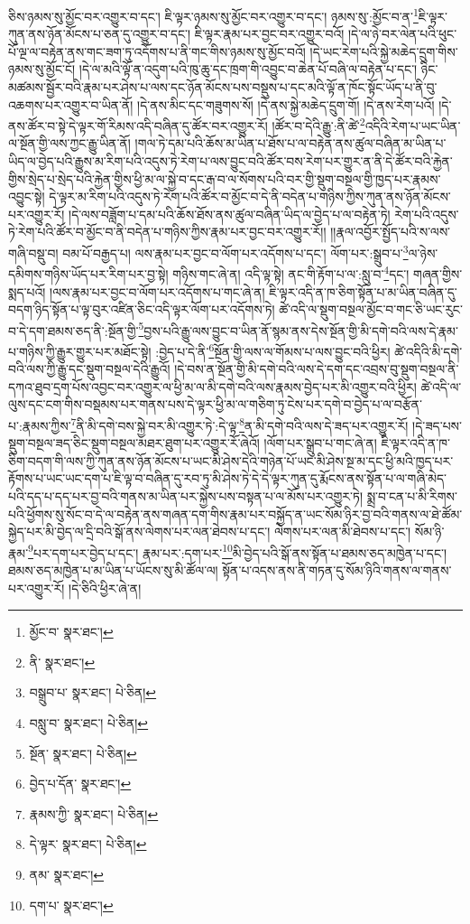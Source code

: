 ཅིས་ཉམས་སུ་མྱོང་བར་འགྱུར་བ་དང་། ཇི་ལྟར་ཉམས་སུ་མྱོང་བར་འགྱུར་བ་དང་། ཉམས་སུ་:མྱོང་བ་ན་\footnote{མྱོང་བ་  སྣར་ཐང་། }ཇི་ལྟར་ཀུན་ནས་ཉོན་མོངས་པ་ཅན་དུ་འགྱུར་བ་དང་། ཇི་ལྟར་རྣམ་པར་བྱང་བར་འགྱུར་བའོ། །དེ་ལ་ཉེ་བར་ལེན་པའི་ཕུང་པོ་ལྔ་ལ་བརྟེན་ནས་གང་ཟག་ཏུ་འདོགས་པ་ནི་གང་གིས་ཉམས་སུ་མྱོང་བའོ། །དེ་ཡང་རེག་པའི་སྐྱེ་མཆེད་དྲུག་གིས་ཉམས་སུ་མྱོང་ངོ། །དེ་ལ་མའི་ལྟོ་ན་འདུག་པའི་ཁུ་ཆུ་དང་ཁྲག་གི་འབྱུང་བ་ཆེན་པོ་བཞི་ལ་བརྟེན་པ་དང་། ཉིང་མཚམས་སྦྱོར་བའི་རྣམ་པར་ཤེས་པ་ལས་དང་ཉོན་མོངས་པས་བསྡུས་པ་དང་མའི་ལྟོ་ན་ཁོང་སྟོང་ཡོད་པ་ནི་བུ་འཆགས་པར་འགྱུར་བ་ཡིན་ནོ། །དེ་ནས་མིང་དང་གཟུགས་སོ། །དེ་ནས་སྐྱེ་མཆེད་དྲུག་གོ། །དེ་ནས་རེག་པའོ། །དེ་ནས་ཚོར་བ་སྟེ་དེ་ལྟར་གོ་རིམས་འདི་བཞིན་དུ་ཚོར་བར་འགྱུར་རོ། །ཚོར་བ་དེའི་རྒྱུ་:ནི་ཚེ་\footnote{ནི་  སྣར་ཐང་། }འདིའི་རེག་པ་ཡང་ཡིན་ལ་སྔོན་གྱི་ལས་ཀྱང་རྒྱུ་ཡིན་ནོ། །གལ་ཏེ་དམ་པའི་ཆོས་མ་ཡིན་པ་ཐོས་པ་ལ་བརྟེན་ནས་ཚུལ་བཞིན་མ་ཡིན་པ་ཡིད་ལ་བྱེད་པའི་རྒྱུས་མ་རིག་པའི་འདུས་ཏེ་རེག་པ་ལས་བྱུང་བའི་ཚོར་བས་རེག་པར་གྱུར་ན་ནི་དེ་ཚོར་བའི་རྐྱེན་གྱིས་སྲེད་པ་སྲེད་པའི་རྐྱེན་གྱིས་ཕྱི་མ་ལ་སྐྱེ་བ་དང་རྒ་བ་ལ་སོགས་པའི་བར་གྱི་སྡུག་བསྔལ་གྱི་ཁྱད་པར་རྣམས་འབྱུང་སྟེ། དེ་ལྟར་མ་རིག་པའི་འདུས་ཏེ་རེག་པའི་ཚོར་བ་མྱོང་བ་དེ་ནི་བདེན་པ་གཉིས་ཀྱིས་ཀུན་ནས་ཉོན་མོངས་པར་འགྱུར་རོ། །དེ་ལས་བཟློག་པ་དམ་པའི་ཆོས་ཐོས་ནས་ཚུལ་བཞིན་ཡིད་ལ་བྱེད་པ་ལ་བརྟེན་ཏེ། རེག་པའི་འདུས་ཏེ་རེག་པའི་ཚོར་བ་མྱོང་བ་ནི་བདེན་པ་གཉིས་ཀྱིས་རྣམ་པར་བྱང་བར་འགྱུར་རོ།། །།རྣལ་འབྱོར་སྤྱོད་པའི་ས་ལས་གཞི་བསྡུ་བ། བམ་པོ་བརྒྱད་པ། ལས་རྣམ་པར་བྱང་བ་ལོག་པར་འདོགས་པ་དང་། ལོག་པར་:སྒྲུབ་པ་\footnote{བསྒྲུབ་པ་  སྣར་ཐང་།  པེ་ཅིན། }ལ་ཉེས་དམིགས་གཉིས་ཡོད་པར་རིག་པར་བྱ་སྟེ། གཉིས་གང་ཞེ་ན། འདི་ལྟ་སྟེ། ནང་གི་རྟོག་པ་ལ་:སླུ་བ་\footnote{བསླུ་བ་  སྣར་ཐང་།  པེ་ཅིན། }དང་། གཞན་གྱིས་སྨད་པའོ། །ལས་རྣམ་པར་བྱང་བ་ལོག་པར་འདོགས་པ་གང་ཞེ་ན། ཇི་ལྟར་འདི་ན་ཁ་ཅིག་སྟོན་པ་མ་ཡིན་བཞིན་དུ་བདག་ཉིད་སྟོན་པ་ལྟ་བུར་འཛིན་ཅིང་འདི་ལྟར་ལོག་པར་འདོགས་ཏེ། ཚེ་འདི་ལ་སྡུག་བསྔལ་མྱོང་བ་གང་ཅི་ཡང་རུང་བ་དེ་དག་ཐམས་ཅད་ནི་:སྔོན་གྱི་\footnote{སྔོན་  སྣར་ཐང་།  པེ་ཅིན། }བྱས་པའི་རྒྱུ་ལས་བྱུང་བ་ཡིན་ནོ་སྙམ་ནས་དེས་སྔོན་གྱི་མི་དགེ་བའི་ལས་དེ་རྣམ་པ་གཉིས་ཀྱི་རྒྱུར་གྱུར་པར་མཐོང་སྟེ། :བྱེད་པ་དེ་ནི་\footnote{བྱེད་པ་དོན་  སྣར་ཐང་། }སྔོན་གྱི་ལས་ལ་གོམས་པ་ལས་བྱུང་བའི་ཕྱིར། ཚེ་འདིའི་མི་དགེ་བའི་ལས་ཀྱི་རྒྱུ་དང་སྡུག་བསྔལ་དེའི་རྒྱུའོ། །དེ་བས་ན་སྔོན་གྱི་མི་དགེ་བའི་ལས་དེ་དག་དང་འབྲས་བུ་སྡུག་བསྔལ་ནི་དཀའ་ཐུབ་དྲག་པོས་འབྱང་བར་འགྱུར་ལ་ཕྱི་མ་ལ་མི་དགེ་བའི་ལས་རྣམས་བྱེད་པར་མི་འགྱུར་བའི་ཕྱིར། ཚེ་འདི་ལ་ལུས་དང་ངག་གིས་བསྡམས་པར་གནས་པས་དེ་ལྟར་ཕྱི་མ་ལ་གཅིག་ཏུ་ངེས་པར་དགེ་བ་བྱེད་པ་ལ་བརྩོན་པ་:རྣམས་ཀྱིས་\footnote{རྣམས་ཀྱི་  སྣར་ཐང་།  པེ་ཅིན། }ནི་མི་དགེ་བས་སྐྱེ་བར་མི་འགྱུར་ཏེ་:དེ་ལྟ་\footnote{དེ་ལྟར་  སྣར་ཐང་།  པེ་ཅིན། }ན་མི་དགེ་བའི་ལས་དེ་ཟད་པར་འགྱུར་རོ། །དེ་ཟད་པས་སྡུག་བསྔལ་ཟད་ཅིང་སྡུག་བསྔལ་མཐར་ཐུག་པར་འགྱུར་རོ་ཞེའོ། །ལོག་པར་སྒྲུབ་པ་གང་ཞེ་ན། ཇི་ལྟར་འདི་ན་ཁ་ཅིག་བདག་གི་ལས་ཀྱི་ཀུན་ནས་ཉོན་མོངས་པ་ཡང་མི་ཤེས་དེའི་གཉེན་པོ་ཡང་མི་ཤེས་སྔ་མ་དང་ཕྱི་མའི་ཁྱད་པར་རྟོགས་པ་ཡང་ཡང་དག་པ་ཇི་ལྟ་བ་བཞིན་དུ་རབ་ཏུ་མི་ཤེས་ཏེ་དེ་དེ་ལྟར་ཀུན་དུ་རྨོངས་ནས་སྟོན་པ་ལ་གཞི་མེད་པའི་དད་པ་དད་པར་བྱ་བའི་གནས་མ་ཡིན་པར་སྐྱེས་པས་བསྟན་པ་ལ་མོས་པར་འགྱུར་ཏེ། སྨྲ་བ་ངན་པ་མི་རིགས་པའི་ཕྱོགས་སུ་སོང་བ་དེ་ལ་བརྟེན་ནས་གཞན་དག་གིས་རྣམ་པར་བསྐྱོད་ན་ཡང་སོམ་ཉིར་བྱ་བའི་གནས་ལ་ཐེ་ཚོམ་སྐྱེད་པར་མི་བྱེད་ལ་དྲི་བའི་སྒོ་ནས་ལེགས་པར་ལན་ཐེབས་པ་དང་། ལེགས་པར་ལན་མི་ཐེབས་པ་དང་། སོམ་ཉི་རྣམ་\footnote{ནམ་  སྣར་ཐང་། }པར་དག་པར་བྱེད་པ་དང་། རྣམ་པར་:དག་པར་\footnote{དག་པ་  སྣར་ཐང་། }མི་བྱེད་པའི་སྒོ་ནས་སྟོན་པ་ཐམས་ཅད་མཁྱེན་པ་དང་། ཐམས་ཅད་མཁྱེན་པ་མ་ཡིན་པ་ཡོངས་སུ་མི་ཚོལ་ལ། སྟོན་པ་འདས་ནས་ནི་གཏན་དུ་སོམ་ཉིའི་གནས་ལ་གནས་པར་འགྱུར་རོ། །དེ་ཅིའི་ཕྱིར་ཞེ་ན། 